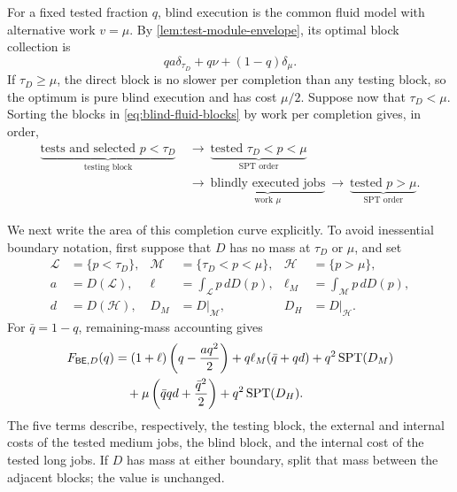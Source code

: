 For a fixed tested fraction $q$, blind execution is the common fluid model
with alternative work $v=\mu$.  By \cref{lem:test-module-envelope}, its
optimal block collection is
\begin{equation}
 qa\delta_{\tau_D}+q\nu+(1-q)\delta_\mu.
 \label{eq:blind-fluid-blocks}
\end{equation}
If $\tau_D\ge\mu$, the direct block is no slower per completion than any
testing block, so the optimum is pure blind execution and has cost $\mu/2$.
Suppose now that $\tau_D<\mu$.  Sorting the blocks in
\cref{eq:blind-fluid-blocks} by work per completion gives, in order,
\begin{equation}
 \begin{aligned}
 \underbrace{\text{tests and selected }p<\tau_D}_{\text{testing block}}
 &\ \longrightarrow\
 \underbrace{\text{tested }\tau_D<p<\mu}_{\text{SPT order}}\\[-2pt]
 &\ \longrightarrow\
 \underbrace{\text{blindly executed jobs}}_{\text{work }\mu}
 \ \longrightarrow\
 \underbrace{\text{tested }p>\mu}_{\text{SPT order}}.
 \end{aligned}
 \label{eq:blind-four-block-order}
\end{equation}

We next write the area of this completion curve explicitly.  To avoid
inessential boundary notation, first suppose that $D$ has no mass at
$\tau_D$ or $\mu$, and set
\begin{align*}
 \mathcal L&=\{p<\tau_D\},&
 \mathcal M&=\{\tau_D<p<\mu\},&
 \mathcal H&=\{p>\mu\},\\
 a&=D(\mathcal L),&
 \ell&=\int_{\mathcal L}p\,dD(p),&
 \ell_M&=\int_{\mathcal M}p\,dD(p),\\
 d&=D(\mathcal H),&
 D_M&=D|_{\mathcal M},&D_H&=D|_{\mathcal H}.
\end{align*}
For $\bar q=1-q$, remaining-mass accounting gives
\begin{align}
 F_{\mathsf{BE},D}(q)
 &= (1+\ell)\left(q-\frac{aq^2}{2}\right)
    +q\ell_M(\bar q+qd)+q^2\operatorname{SPT}(D_M)\notag\\
 &\quad+\mu\left(\bar q qd+\frac{\bar q^2}{2}\right)
    +q^2\operatorname{SPT}(D_H).
 \label{eq:blind-F}
\end{align}
The five terms describe, respectively, the testing block, the external and
internal costs of the tested medium jobs, the blind block, and the internal
cost of the tested long jobs.  If $D$ has mass at either boundary, split that
mass between the adjacent blocks; the value is unchanged.

